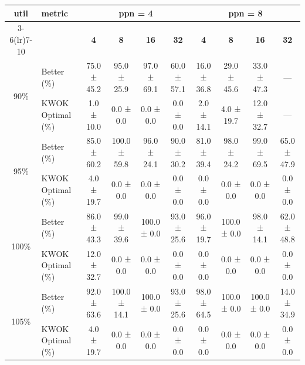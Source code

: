 \begin{tabular}{@{}c l *{8}{c}@{}}
\toprule
\multirow{2}{*}{\textbf{util}} & \multirow{2}{*}{\textbf{metric}} &\multicolumn{4}{c}{\textbf{ppn = 4}} & \multicolumn{4}{c}{\textbf{ppn = 8}}\\
\cmidrule(lr){3-6}\cmidrule(lr){7-10}
 &  & \textbf{4} & \textbf{8} & \textbf{16} & \textbf{32} & \textbf{4} & \textbf{8} & \textbf{16} & \textbf{32}\\
\midrule
\multirow{2}{*}{90\%}
& Better\,(\%) & 75.0 ± 45.2 & 95.0 ± 25.9 & 97.0 ± 69.1 & 60.0 ± 57.1 & 16.0 ± 36.8 & 29.0 ± 45.6 & 33.0 ± 47.3 & \multicolumn{1}{c}{—} \\
& KWOK\,Optimal\,(\%) & 1.0 ± 10.0 & 0.0 ± 0.0 & 0.0 ± 0.0 & 0.0 ± 0.0 & 2.0 ± 14.1 & 4.0 ± 19.7 & 12.0 ± 32.7 & \multicolumn{1}{c}{—} \\
\midrule
\multirow{2}{*}{95\%}
& Better\,(\%) & 85.0 ± 60.2 & 100.0 ± 59.8 & 96.0 ± 24.1 & 90.0 ± 30.2 & 81.0 ± 39.4 & 98.0 ± 24.2 & 99.0 ± 69.5 & 65.0 ± 47.9 \\
& KWOK\,Optimal\,(\%) & 4.0 ± 19.7 & 0.0 ± 0.0 & 0.0 ± 0.0 & 0.0 ± 0.0 & 0.0 ± 0.0 & 0.0 ± 0.0 & 0.0 ± 0.0 & 0.0 ± 0.0 \\
\midrule
\multirow{2}{*}{100\%}
& Better\,(\%) & 86.0 ± 43.3 & 99.0 ± 39.6 & 100.0 ± 0.0 & 93.0 ± 25.6 & 96.0 ± 19.7 & 100.0 ± 0.0 & 98.0 ± 14.1 & 62.0 ± 48.8 \\
& KWOK\,Optimal\,(\%) & 12.0 ± 32.7 & 0.0 ± 0.0 & 0.0 ± 0.0 & 0.0 ± 0.0 & 0.0 ± 0.0 & 0.0 ± 0.0 & 0.0 ± 0.0 & 0.0 ± 0.0 \\
\midrule
\multirow{2}{*}{105\%}
& Better\,(\%) & 92.0 ± 63.6 & 100.0 ± 14.1 & 100.0 ± 0.0 & 93.0 ± 25.6 & 98.0 ± 64.5 & 100.0 ± 0.0 & 100.0 ± 0.0 & 14.0 ± 34.9 \\
& KWOK\,Optimal\,(\%) & 4.0 ± 19.7 & 0.0 ± 0.0 & 0.0 ± 0.0 & 0.0 ± 0.0 & 0.0 ± 0.0 & 0.0 ± 0.0 & 0.0 ± 0.0 & 0.0 ± 0.0 \\
\bottomrule
\end{tabular}
